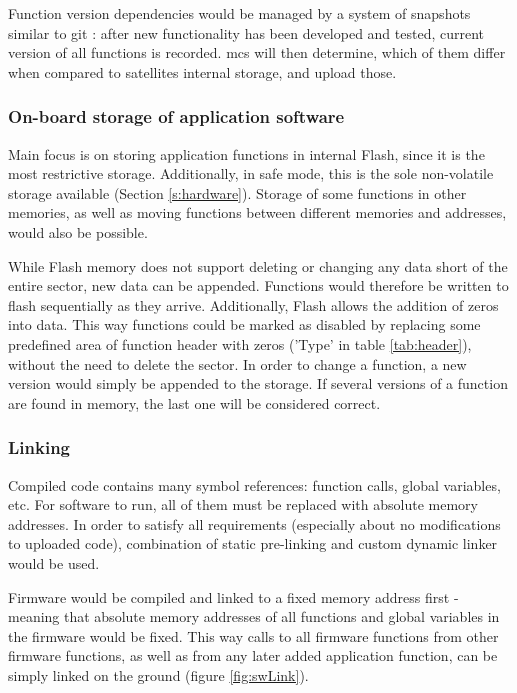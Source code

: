 Function version dependencies would be managed by a system of snapshots similar to git \cite[Chapter~1.3]{Chacon2018}: after new functionality has been developed and tested, current version of all functions is recorded. \Gls{mcs} will then determine, which of them differ when compared to satellites internal storage, and upload those.

\subsubsection{On-board storage of application software}

Main focus is on storing application functions in internal Flash, since it is the most restrictive storage. Additionally, in safe mode, this is the sole non-volatile storage available (Section \ref{s:hardware}). Storage of some functions in other memories, as well as moving functions between different memories and addresses, would also be possible.

While Flash memory does not support deleting or changing any data short of the entire sector, new data can be appended. Functions would therefore be written to flash sequentially as they arrive. Additionally, Flash allows the addition of zeros into data. This way functions could be marked as disabled by replacing some predefined area of function header with zeros ('Type' in table \ref{tab:header}), without the need to delete the sector. In order to change a function, a new version would simply be appended to the storage. If several versions of a function are found in memory, the last one will be considered correct.

\subsubsection{Linking}

Compiled code contains many symbol references: function calls, global variables, etc. For software to run, all of them must be replaced with absolute memory addresses. In order to satisfy all requirements (especially about no modifications to uploaded code), combination of static pre-linking and custom dynamic linker would be used.

Firmware would be compiled and linked to a fixed memory address first - meaning that absolute memory addresses of all functions and global variables in the firmware would be fixed. This way calls to all firmware functions from other firmware functions, as well as from any later added application function, can be simply linked on the ground (figure \ref{fig:swLink}).


